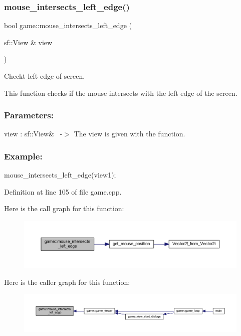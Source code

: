 \subsubsection{\texorpdfstring{mouse\+\_\+intersects\+\_\+left\+\_\+edge()}{mouse\_intersects\_left\_edge()}}
{\footnotesize\ttfamily bool game\+::mouse\+\_\+intersects\+\_\+left\+\_\+edge (\begin{DoxyParamCaption}\item[{sf\+::\+View \&}]{view }\end{DoxyParamCaption})\hspace{0.3cm}{\ttfamily [private]}}



Checkt left edge of screen. 

This function checks if the mouse intersects with the left edge of the screen.~\newline
 \subsubsection*{Parameters\+: }

view \+: sf\+::\+View\&~\newline
-\/$>$ The view is given with the function.

\subsubsection*{Example\+: }

mouse\+\_\+intersects\+\_\+left\+\_\+edge(view1); 

Definition at line 105 of file game.\+cpp.

Here is the call graph for this function\+:
\nopagebreak
\begin{figure}[H]
\begin{center}
\leavevmode
\includegraphics[width=350pt]{classgame_ae263cdc30dcc916b98b0ddbbf0a6fccc_cgraph}
\end{center}
\end{figure}
Here is the caller graph for this function\+:
\nopagebreak
\begin{figure}[H]
\begin{center}
\leavevmode
\includegraphics[width=350pt]{classgame_ae263cdc30dcc916b98b0ddbbf0a6fccc_icgraph}
\end{center}
\end{figure}
\mbox{\label{classgame_a273013552bc7ad8fef9d9192aad3cc0c}} 
